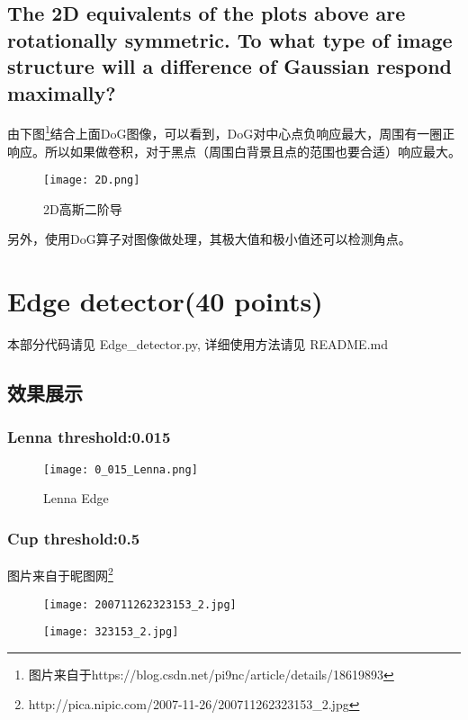 \documentclass[a4paper,UTF8,11pt]{article}
\numberwithin{equation}{section}
\begin{document}
\subsection{The 2D equivalents of the plots above are rotationally symmetric. To what type of image structure will a difference of Gaussian respond maximally?}
由下图\footnote{图片来自于https://blog.csdn.net/pi9nc/article/details/18619893}结合上面DoG图像，可以看到，DoG对中心点负响应最大，周围有一圈正响应。所以如果做卷积，对于黑点（周围白背景且点的范围也要合适）响应最大。
	\begin{figure}[h]
		\centering  %
		\texttt{[image: 2D.png]}  %
		\caption{2D高斯二阶导}  %
	\end{figure}
	
另外，使用DoG算子对图像做处理，其极大值和极小值还可以检测角点。

\newpage


\section{Edge detector(40 points)}
本部分代码请见 Edge\_detector.py, 详细使用方法请见 README.md

\subsection{效果展示}
\subsubsection{Lenna  threshold:0.015}
	\begin{figure}[h]
		\centering  %
		\texttt{[image: 0\_015\_Lenna.png]}  %
		\caption{Lenna Edge}  %
	\end{figure}
\newpage
\subsubsection{Cup  threshold:0.5}
图片来自于昵图网\footnote{http://pica.nipic.com/2007-11-26/200711262323153\_2.jpg}
\begin{figure}[h]
\centering
\begin{minipage}[t]{0.48\textwidth}
\centering
\texttt{[image: 200711262323153\_2.jpg]}
\end{minipage}
\begin{minipage}[t]{0.48\textwidth}
\centering
\texttt{[image: 323153\_2.jpg]}
\end{minipage}
\end{figure}
\end{document}

